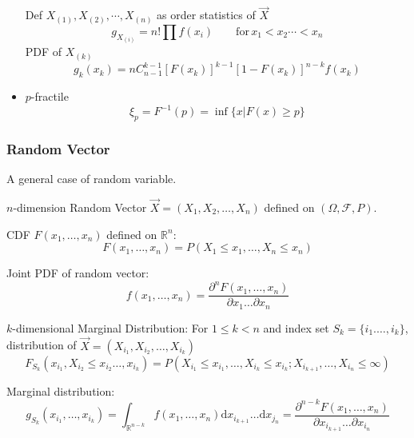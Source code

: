 \begin{itemize}
        Def $X_{(1)},X_{(2)},\cdots,X_{(n)}$ as order statistics of $\vec{X}$
        \begin{equation}    
            g_{X_{(i)}}=n!\prod f(x_i)\qquad \mathrm{for}\, x_1<x_2\cdots <x_n    
        \end{equation}
        PDF of $X_{(k)}$
        \begin{equation}    
            g_k(x_k)=nC_{n-1}^{k-1}[F(x_k)]^{k-1}[1-F(x_k)]^{n-k}f(x_k)
        \end{equation}
        \item $p$-fractile
        \begin{equation}    \xi_p=F^{-1}(p)=\inf\{x|F(x)\geq p\}\end{equation}
    \end{itemize}






\subsubsection{Random Vector}
    A general case of random variable.

    $n$-dimension Random Vector $\vec{X}=(X_1,X_2,\ldots,X_n)$ defined on $(\Omega,\mathscr{F},P)$.

    CDF $F(x_1,\ldots,x_n)$ defined on $\mathbb{R}^n$:
    \begin{equation}F(x_1,\ldots,x_n)=P(X_1\leq x_1,\ldots,X_n\leq x_n)\end{equation}

    Joint PDF of random vector: 
    \begin{equation}
        f(x_1,\ldots,x_n)=\dfrac{\partial^n F(x_1,\ldots,x_n)}{\partial x_1\ldots\partial x_n}
    \end{equation}

    $k$-dimensional Marginal Distribution: For $1\leq k<n$ and index set $S_k=\{i_1.\ldots,i_k\}$, distribution of $\vec{X}=(X_{i_1},X_{i_2},\ldots,X_{i_k})$
    \begin{equation}F_{S_k}(x_{i_1},X_{i_2}\leq x_{i_2}\ldots,x_{i_k})=P(X_{i_1}\leq x_{i_1},\ldots,X_{i_k}\leq x_{i_k};X_{i_{k+1}},\ldots,X_{i_n}\leq\infty)\end{equation}

    Marginal distribution: 
    \begin{equation}
        g_{S_k}(x_{i_1},\ldots,x_{i_k})=\int_{\mathbb{R}^{n-k}}f(x_1,\ldots,x_n)\mathrm{d}x_{i_{k+1}}\ldots\mathrm{d}x_{j_n}=\dfrac{\partial^{n-k}F(x_1,\ldots,x_n)}{\partial x_{i_{k+1}}\ldots\partial x_{i_n}}
    \end{equation}



